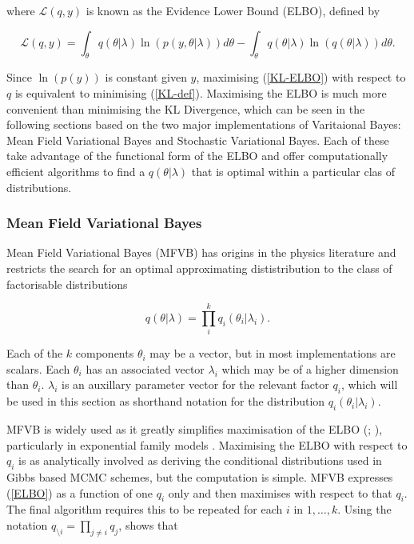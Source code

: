 \documentclass[12pt,a4paper]{article}%
\numberwithin{equation}{section}
\begin{document}
where $\mathcal{L}(q, y)$ is known as the Evidence Lower Bound (ELBO), defined by

\begin{equation}
\label{ELBO}
\mathcal{L}(q, y) = \int_{\theta} q(\theta|\lambda) \ln (p(y, \theta|\lambda)) d\theta -  \int_{\theta} q(\theta|\lambda) \ln (q(\theta|\lambda)) d\theta.
\end{equation}

Since $\ln(p(y))$ is constant given $y$, maximising (\ref{KL-ELBO}) with respect to $q$ is equivalent to minimising (\ref{KL-def}). Maximising the ELBO is much more convenient than minimising the KL Divergence, which can be seen in the following sections based on the two major implementations of Varitaional Bayes: Mean Field Variational Bayes and Stochastic Variational Bayes. Each of these take advantage of the functional form of the ELBO and offer computationally efficient algorithms to find a $q(\theta | \lambda)$ that is optimal within a particular clas of distributions. 

\subsubsection{Mean Field Variational Bayes} 



Mean Field Variational Bayes (MFVB) has origins in the physics literature \citep{Chandler1987} and restricts the search for an optimal approximating dististribution to the class of factorisable distributions

\begin{equation}
\label{mf1}
q(\theta|\lambda) = \prod_i^k q_i(\theta_i | \lambda_i).
\end{equation}

Each of the $k$ components $\theta_i$ may be a vector, but in most implementations are scalars. Each $\theta_i$ has an associated vector $\lambda_i$ which may be of a higher dimension than $\theta_i$. $\lambda_i$ is an auxillary parameter vector for the relevant factor $q_i$, which will be used in this section as shorthand notation for the distribution $q_i(\theta_i |\lambda_i)$. 

MFVB is widely used as it greatly simplifies maximisation of the ELBO (\citealp{Jordan1999}; \citealp{Bishop2006}), particularly in exponential family models \citep{Wainwright2008}.  Maximising the ELBO with respect to $q_i$ is as analytically involved as deriving the conditional distributions used in Gibbs based MCMC schemes, but the computation is simple. MFVB expresses (\ref{ELBO}) as a function of one $q_i$ only and then maximises with respect to that $q_i$. The final algorithm requires this to be repeated for each $i$ in $1, \dots, k$. Using the notation $q_{\setminus i} = \prod_{j\neq i}q_j$, \citet{Attias1999} shows that 
\end{document}
